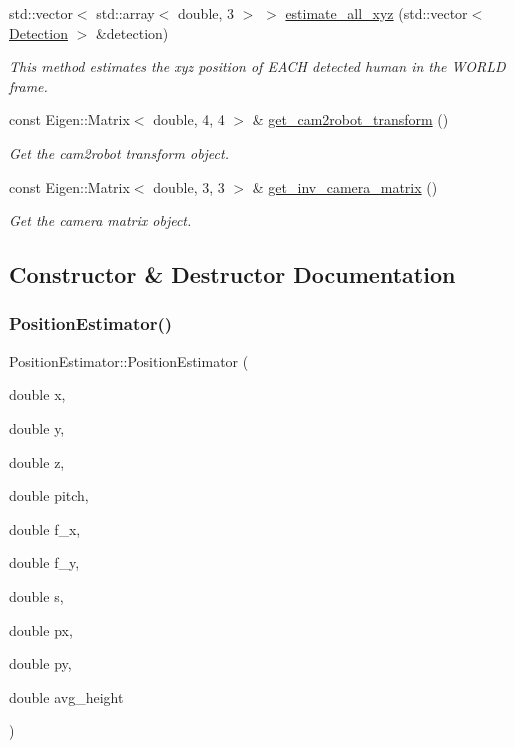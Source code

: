\begin{DoxyCompactItemize}
std\+::vector$<$ std\+::array$<$ double, 3 $>$ $>$ \hyperlink{class_position_estimator_a9bc700bc3de4749f5ec40a892c52a09d}{estimate\+\_\+all\+\_\+xyz} (std\+::vector$<$ \hyperlink{struct_detection}{Detection} $>$ \&detection)
\begin{DoxyCompactList}\small\item\em This method estimates the xyz position of E\+A\+CH detected human in the W\+O\+R\+LD frame. \end{DoxyCompactList}\item 
const Eigen\+::\+Matrix$<$ double, 4, 4 $>$ \& \hyperlink{class_position_estimator_a12ae9fe6ea2f7ca1e2054e018c5dabf5}{get\+\_\+cam2robot\+\_\+transform} ()
\begin{DoxyCompactList}\small\item\em Get the cam2robot transform object. \end{DoxyCompactList}\item 
const Eigen\+::\+Matrix$<$ double, 3, 3 $>$ \& \hyperlink{class_position_estimator_a6832a1905352d24cbc834f2f205ba09b}{get\+\_\+inv\+\_\+camera\+\_\+matrix} ()
\begin{DoxyCompactList}\small\item\em Get the camera matrix object. \end{DoxyCompactList}\end{DoxyCompactItemize}


\subsection{Constructor \& Destructor Documentation}
\mbox{\label{class_position_estimator_a39de44247f8c8feaed5bd1de8438245f}} 
\subsubsection{\texorpdfstring{Position\+Estimator()}{PositionEstimator()}\hspace{0.1cm}{\footnotesize\ttfamily [1/2]}}
{\footnotesize\ttfamily Position\+Estimator\+::\+Position\+Estimator (\begin{DoxyParamCaption}\item[{double}]{x,  }\item[{double}]{y,  }\item[{double}]{z,  }\item[{double}]{pitch,  }\item[{double}]{f\+\_\+x,  }\item[{double}]{f\+\_\+y,  }\item[{double}]{s,  }\item[{double}]{px,  }\item[{double}]{py,  }\item[{double}]{avg\+\_\+height }\end{DoxyParamCaption})\hspace{0.3cm}{\ttfamily [inline]}}

